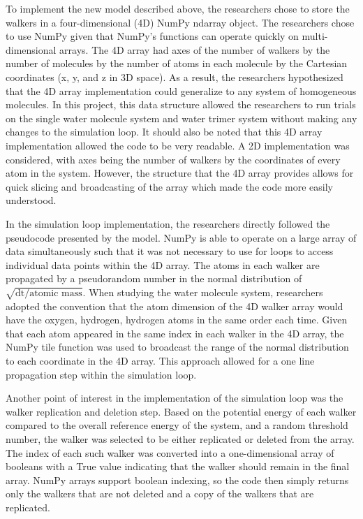 \documentclass[journal=jacsat,manuscript=article]{achemso}
\begin{document}
To implement the new model described above, the researchers chose to store the walkers in a four-dimensional (4D) NumPy ndarray object. The researchers chose to use NumPy given that NumPy’s functions can operate quickly on multi-dimensional arrays. The 4D array had axes of the number of walkers by the number of molecules by the number of atoms in each molecule by the Cartesian coordinates (x, y, and z in 3D space). As a result, the researchers hypothesized that the 4D array implementation could generalize to any system of homogeneous molecules. In this project, this data structure allowed the researchers to run trials on the single water molecule system and water trimer system without making any changes to the simulation loop. It should also be noted that this 4D array implementation allowed the code to be very readable. A 2D implementation was considered, with axes being the number of walkers by the coordinates of every atom in the system. However, the structure that the 4D array provides allows for quick slicing and broadcasting of the array which made the code more easily understood.

In the simulation loop implementation, the researchers directly followed the pseudocode presented by the model. NumPy is able to operate on a large array of data simultaneously such that it was not necessary to use for loops to access individual data points within the 4D array. The atoms in each walker are propagated by a pseudorandom number in the normal distribution of $\sqrt{\text{dt}/\text{atomic mass}}$. When studying the water molecule system, researchers adopted the convention that the atom dimension of the 4D walker array would have the oxygen, hydrogen, hydrogen atoms in the same order each time. Given that each atom appeared in the same index in each walker in the 4D array, the NumPy tile function was used to broadcast the range of the normal distribution to each coordinate in the 4D array. This approach allowed for a one line propagation step within the simulation loop. 

Another point of interest in the implementation of the simulation loop was the walker replication and deletion step. Based on the potential energy of each walker compared to the overall reference energy of the system, and a random threshold number, the walker was selected to be either replicated or deleted from the array. The index of each such walker was converted into a one-dimensional array of booleans with a True value indicating that the walker should remain in the final array. NumPy arrays support boolean indexing, so the code then simply returns only the walkers that are not deleted and a copy of the walkers that are replicated.
\end{document}
